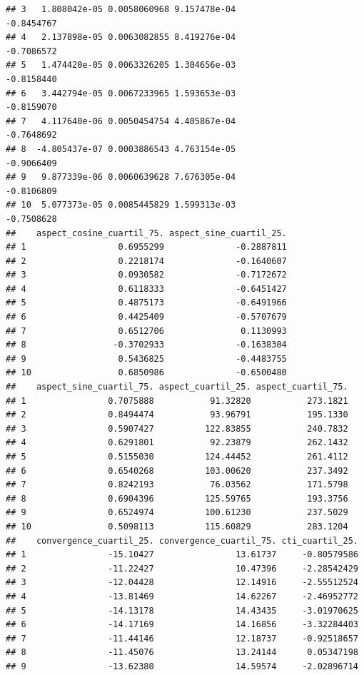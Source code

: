\documentclass[11pt,]{article}
\begin{document}
\begin{verbatim}
## 3   1.808042e-05 0.0058060968 9.157478e-04                -0.8454767
## 4   2.137898e-05 0.0063082855 8.419276e-04                -0.7086572
## 5   1.474420e-05 0.0063326205 1.304656e-03                -0.8158440
## 6   3.442794e-05 0.0067233965 1.593653e-03                -0.8159070
## 7   4.117640e-06 0.0050454754 4.405867e-04                -0.7648692
## 8  -4.805437e-07 0.0003886543 4.763154e-05                -0.9066409
## 9   9.877339e-06 0.0060639628 7.676305e-04                -0.8106809
## 10  5.077373e-05 0.0085445829 1.599313e-03                -0.7508628
##    aspect_cosine_cuartil_75. aspect_sine_cuartil_25.
## 1                  0.6955299              -0.2887811
## 2                  0.2218174              -0.1640607
## 3                  0.0930582              -0.7172672
## 4                  0.6118333              -0.6451427
## 5                  0.4875173              -0.6491966
## 6                  0.4425409              -0.5707679
## 7                  0.6512706               0.1130993
## 8                 -0.3702933              -0.1638304
## 9                  0.5436825              -0.4483755
## 10                 0.6850986              -0.6500480
##    aspect_sine_cuartil_75. aspect_cuartil_25. aspect_cuartil_75.
## 1                0.7075888           91.32820           273.1821
## 2                0.8494474           93.96791           195.1330
## 3                0.5907427          122.83855           240.7832
## 4                0.6291801           92.23879           262.1432
## 5                0.5155030          124.44452           261.4112
## 6                0.6540268          103.00620           237.3492
## 7                0.8242193           76.03562           171.5798
## 8                0.6904396          125.59765           193.3756
## 9                0.6524974          100.61230           237.5029
## 10               0.5098113          115.60829           283.1204
##    convergence_cuartil_25. convergence_cuartil_75. cti_cuartil_25.
## 1                -15.10427                13.61737     -0.80579586
## 2                -11.22427                10.47396     -2.28542429
## 3                -12.04428                12.14916     -2.55512524
## 4                -13.81469                14.62267     -2.46952772
## 5                -14.13178                14.43435     -3.01970625
## 6                -14.17169                14.16856     -3.32284403
## 7                -11.44146                12.18737     -0.92518657
## 8                -11.45076                13.24144      0.05347198
## 9                -13.62380                14.59574     -2.02896714

\end{verbatim}
\end{document}
